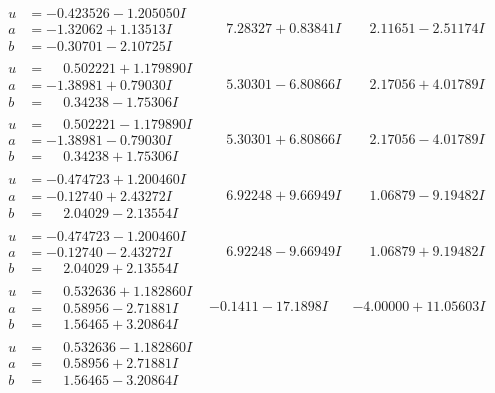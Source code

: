 \documentclass[1p]{elsarticle_modified}
\theoremstyle{definition}
\begin{document}
$$\begin{array}{c|c|c}
\begin{aligned}
u &= -0.423526 - 1.205050 I \\
a &= -1.32062 + 1.13513 I \\
b &= -0.30701 - 2.10725 I\end{aligned}
 & \phantom{-}7.28327 + 0.83841 I & \phantom{-}2.11651 - 2.51174 I \\ \hline\begin{aligned}
u &= \phantom{-}0.502221 + 1.179890 I \\
a &= -1.38981 + 0.79030 I \\
b &= \phantom{-}0.34238 - 1.75306 I\end{aligned}
 & \phantom{-}5.30301 - 6.80866 I & \phantom{-}2.17056 + 4.01789 I \\ \hline\begin{aligned}
u &= \phantom{-}0.502221 - 1.179890 I \\
a &= -1.38981 - 0.79030 I \\
b &= \phantom{-}0.34238 + 1.75306 I\end{aligned}
 & \phantom{-}5.30301 + 6.80866 I & \phantom{-}2.17056 - 4.01789 I \\ \hline\begin{aligned}
u &= -0.474723 + 1.200460 I \\
a &= -0.12740 + 2.43272 I \\
b &= \phantom{-}2.04029 - 2.13554 I\end{aligned}
 & \phantom{-}6.92248 + 9.66949 I & \phantom{-}1.06879 - 9.19482 I \\ \hline\begin{aligned}
u &= -0.474723 - 1.200460 I \\
a &= -0.12740 - 2.43272 I \\
b &= \phantom{-}2.04029 + 2.13554 I\end{aligned}
 & \phantom{-}6.92248 - 9.66949 I & \phantom{-}1.06879 + 9.19482 I \\ \hline\begin{aligned}
u &= \phantom{-}0.532636 + 1.182860 I \\
a &= \phantom{-}0.58956 - 2.71881 I \\
b &= \phantom{-}1.56465 + 3.20864 I\end{aligned}
 & -0.1411 - 17.1898 I & -4.00000 + 11.05603 I \\ \hline\begin{aligned}
u &= \phantom{-}0.532636 - 1.182860 I \\
a &= \phantom{-}0.58956 + 2.71881 I \\
b &= \phantom{-}1.56465 - 3.20864 I\end{aligned}

\end{array}$$
\end{document}
